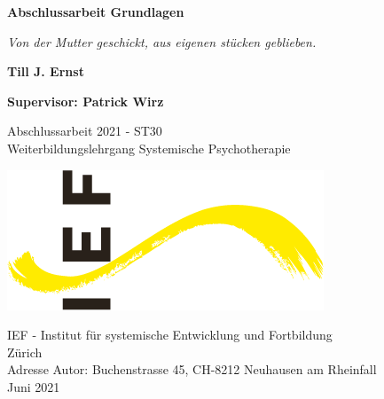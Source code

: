 \begin{titlepage}
    \begin{center}
        \vspace*{1cm}
            
        \Huge
        \textbf{Abschlussarbeit Grundlagen}
            
        \vspace{0.5cm}
        \LARGE
        \textit{Von der Mutter geschickt, aus eigenen stücken geblieben.}
            
        \vspace{1.5cm}
            
        \textbf{Till J. Ernst}
        \vspace{1.5cm}
            
        \textbf{Supervisor: Patrick Wirz}
            
        \vfill
            
        Abschlussarbeit 2021 - ST30\\
        Weiterbildungslehrgang Systemische Psychotherapie
            
        \vspace{1cm}
            
        \includegraphics{pictures/ieflogo}
            
            
        \Large
        IEF - Institut für systemische Entwicklung und Fortbildung\\
        Zürich\\
        
        \vspace{1.5cm}
        Adresse Autor: Buchenstrasse 45, CH-8212 Neuhausen am Rheinfall\\
        Juni 2021
            
    \end{center}
\end{titlepage}